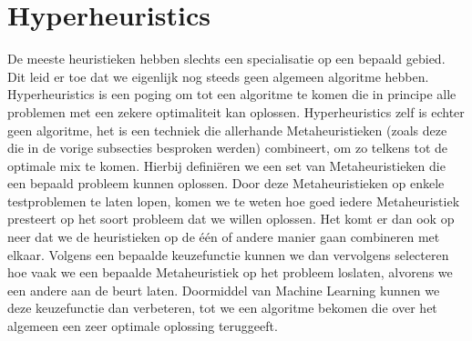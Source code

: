 \section{Hyperheuristics}
\label{ss:hyperheuristics}
De meeste heuristieken hebben slechts een specialisatie op een bepaald gebied. Dit leid er toe dat we eigenlijk nog steeds geen algemeen algoritme hebben. Hyperheuristics is een poging om tot een algoritme te komen die in principe alle problemen met een zekere optimaliteit kan oplossen. Hyperheuristics zelf is echter geen algoritme, het is een techniek die allerhande Metaheuristieken (zoals deze die in de vorige subsecties besproken werden) combineert, om zo telkens tot de optimale mix te komen. Hierbij defini\"eren we een set van Metaheuristieken die een bepaald probleem kunnen oplossen. Door deze Metaheuristieken op enkele testproblemen te laten lopen, komen we te weten hoe goed iedere Metaheuristiek presteert op het soort probleem dat we willen oplossen. Het komt er dan ook op neer dat we de heuristieken op de \'e\'en of andere manier gaan combineren met elkaar. Volgens een bepaalde keuzefunctie kunnen we dan vervolgens selecteren hoe vaak we een bepaalde Metaheuristiek op het probleem loslaten, alvorens we een andere aan de beurt laten. Doormiddel van Machine Learning kunnen we deze keuzefunctie dan verbeteren, tot we een algoritme bekomen die over het algemeen een zeer optimale oplossing teruggeeft.